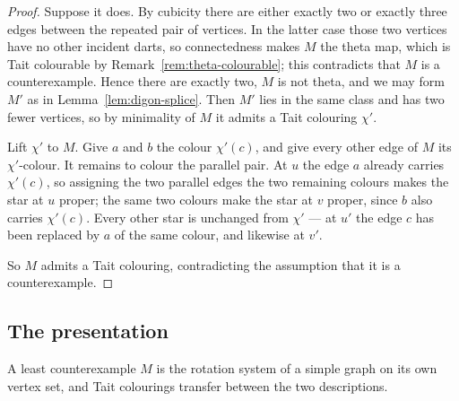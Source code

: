 \begin{proof}
Suppose it does.  By cubicity there are either exactly two or exactly three
edges between the repeated pair of vertices.  In the latter case those two
vertices have no other incident darts, so connectedness makes $M$ the theta
map, which is Tait colourable by Remark~\ref{rem:theta-colourable}; this
contradicts that $M$ is a counterexample.  Hence there are exactly two, $M$ is
not theta, and we may form $M'$ as in Lemma~\ref{lem:digon-splice}. Then $M'$
lies in the same class and has two fewer vertices, so by minimality of $M$
it admits a Tait colouring $\chi'$.

Lift $\chi'$ to $M$. Give $a$ and $b$ the colour $\chi'(c)$, and give every
other edge of $M$ its $\chi'$-colour. It remains to colour the parallel
pair. At $u$ the edge $a$ already carries $\chi'(c)$, so assigning the two
parallel edges the two remaining colours makes the star at $u$ proper; the
same two colours make the star at $v$ proper, since $b$ also carries
$\chi'(c)$. Every other star is unchanged from $\chi'$ --- at $u'$ the edge
$c$ has been replaced by $a$ of the same colour, and likewise at $v'$.

So $M$ admits a Tait colouring, contradicting the assumption that it is a
counterexample.
\end{proof}

\subsection{The presentation}

\begin{theorem}
\label{thm:graph-backed}
A least counterexample $M$ is the rotation system of a simple graph on its
own vertex set, and Tait colourings transfer between the two descriptions.
\end{theorem}

